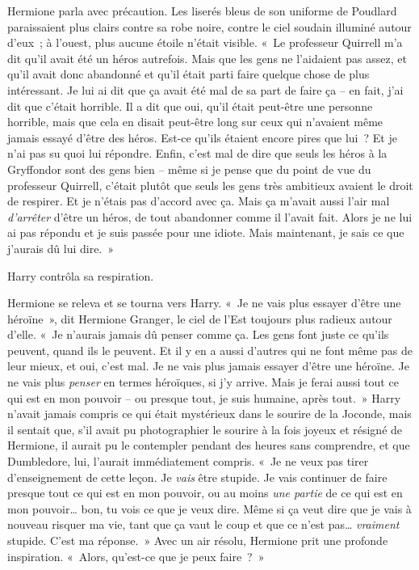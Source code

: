Hermione parla avec précaution.
Les liserés bleus de son uniforme de Poudlard paraissaient plus clairs contre sa robe noire, contre le ciel soudain illuminé autour d'eux~; à l'ouest, plus aucune étoile n'était visible.
«~Le professeur Quirrell m'a dit qu'il avait été un héros autrefois.
Mais que les gens ne l'aidaient pas assez, et qu'il avait donc abandonné et qu'il était parti faire quelque chose de plus intéressant.
Je lui ai dit que ça avait été mal de sa part de faire ça -- en fait, j'ai dit que c'était horrible.
Il a dit que oui, qu'il était peut-être une personne horrible, mais que cela en disait peut-être long sur ceux qui n'avaient même jamais essayé d'être des héros.
Est-ce qu'ils étaient encore pires que lui~?
Et je n'ai pas su quoi lui répondre.
Enfin, c'est mal de dire que seuls les héros à la Gryffondor sont des gens bien -- même si je pense que du point de vue du professeur Quirrell, c'était plutôt que seuls les gens très ambitieux avaient le droit de respirer.
Et je n'étais pas d'accord avec ça.
Mais ça m'avait aussi l'air mal \emph{d'arrêter} d'être un héros, de tout abandonner comme il l'avait fait.
Alors je ne lui ai pas répondu et je suis passée pour une idiote.
Mais maintenant, je sais ce que j'aurais dû lui dire.~»

Harry contrôla sa respiration.

Hermione se releva et se tourna vers Harry.
«~Je ne vais plus essayer d'être une héroïne~», dit Hermione Granger, le ciel de l'Est toujours plus radieux autour d'elle.
«~Je n'aurais jamais dû penser comme ça.
Les gens font juste ce qu'ils peuvent, quand ils le peuvent.
Et il y en a aussi d'autres qui ne font même pas de leur mieux, et oui, c'est mal.
Je ne vais plus jamais essayer d'être une héroïne.
Je ne vais plus \emph{penser} en termes héroïques, si j'y arrive.
Mais je ferai aussi tout ce qui est en mon pouvoir -- ou presque tout, je suis humaine, après tout.~»
Harry n'avait jamais compris ce qui était mystérieux dans le sourire de la Joconde, mais il sentait que, s'il avait pu photographier le sourire à la fois joyeux et résigné de Hermione, il aurait pu le contempler pendant des heures sans comprendre, et que Dumbledore, lui, l'aurait immédiatement compris.
«~Je ne veux pas tirer d'enseignement de cette leçon.
Je \emph{vais} être stupide.
Je vais continuer de faire presque tout ce qui est en mon pouvoir, ou au moins \emph{une partie} de ce qui est en mon pouvoir… bon, tu vois ce que je veux dire.
Même si ça veut dire que je vais à nouveau risquer ma vie, tant que ça vaut le coup et que ce n'est pas…
\emph{vraiment} stupide.
C'est ma réponse.~»
Avec un air résolu, Hermione prit une profonde inspiration.
«~Alors, qu'est-ce que je peux faire~?~»

